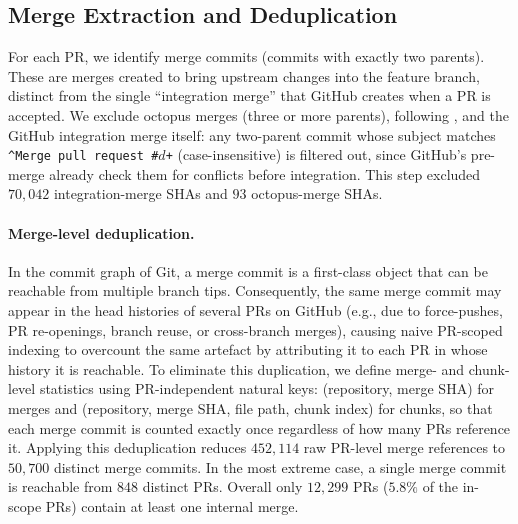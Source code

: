 \documentclass[sigconf,anonymous]{acmart}
\begin{document}
\subsection{Merge Extraction and Deduplication}
\label{sec:meth-merges}

For each PR, we identify merge commits (commits with exactly two parents). These are merges created to bring upstream changes into the feature branch, distinct from the single ``integration merge'' that GitHub creates when a PR is accepted. We exclude octopus merges (three or more parents), following \citet{ghiotto2020nature}, and the GitHub integration merge itself: any two-parent commit whose subject matches \texttt{\textasciicircum{}Merge pull request \#$d$+} (case-insensitive) is filtered out, since GitHub's pre-merge already check them for conflicts before integration. This step excluded $70{,}042$ integration-merge SHAs and $93$ octopus-merge SHAs.

\paragraph{Merge-level deduplication.}
In the commit graph of Git, a merge commit is a first-class object that can be reachable from multiple branch tips. Consequently, the same merge commit may appear in the head histories of several PRs on GitHub (e.g., due to force-pushes, PR re-openings, branch reuse, or cross-branch merges), causing naive PR-scoped indexing to overcount the same artefact by attributing it to each PR in whose history it is reachable. To eliminate this duplication, we define merge- and chunk-level statistics using PR-independent natural keys: (repository, merge SHA) for merges and (repository, merge SHA, file path, chunk index) for chunks, so that each merge commit is counted exactly once regardless of how many PRs reference it. Applying this deduplication reduces $452{,}114$ raw PR-level merge references to $50{,}700$ distinct merge commits. In the most extreme case, a single merge commit is reachable from $848$ distinct PRs. Overall only $12{,}299$ PRs ($5.8\%$ of the in-scope PRs) contain at least one internal merge.
\end{document}
